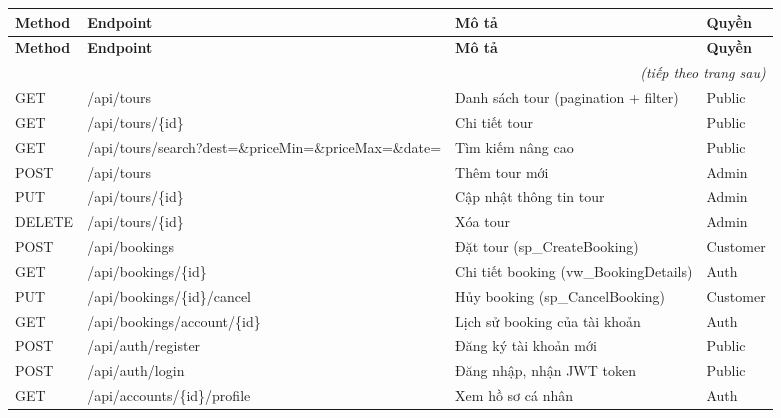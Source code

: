 \begin{longtable}{|l|p{6cm}|p{4.2cm}|l|}
  \hline
  \textbf{Method} & \textbf{Endpoint} & \textbf{Mô tả} & \textbf{Quyền} \\
  \hline
  \endfirsthead
  \hline
  \textbf{Method} & \textbf{Endpoint} & \textbf{Mô tả} & \textbf{Quyền} \\
  \hline
  \endhead
  \multicolumn{4}{r}{\textit{(tiếp theo trang sau)}} \\
  \endfoot
  \hline
  \endlastfoot
  GET    & /api/tours                                     & Danh sách tour (pagination + filter)      & Public   \\ \hline
  GET    & /api/tours/\{id\}                              & Chi tiết tour                             & Public   \\ \hline
  GET    & /api/tours/search?dest=\&priceMin=\&priceMax=\&date= & Tìm kiếm nâng cao               & Public   \\ \hline
  POST   & /api/tours                                     & Thêm tour mới                             & Admin    \\ \hline
  PUT    & /api/tours/\{id\}                              & Cập nhật thông tin tour                   & Admin    \\ \hline
  DELETE & /api/tours/\{id\}                              & Xóa tour                                  & Admin    \\ \hline
  POST   & /api/bookings                                  & Đặt tour (sp\_CreateBooking)              & Customer \\ \hline
  GET    & /api/bookings/\{id\}                           & Chi tiết booking (vw\_BookingDetails)     & Auth     \\ \hline
  PUT    & /api/bookings/\{id\}/cancel                    & Hủy booking (sp\_CancelBooking)           & Customer \\ \hline
  GET    & /api/bookings/account/\{id\}                   & Lịch sử booking của tài khoản             & Auth     \\ \hline
  POST   & /api/auth/register                             & Đăng ký tài khoản mới                    & Public   \\ \hline
  POST   & /api/auth/login                                & Đăng nhập, nhận JWT token                 & Public   \\ \hline
  GET    & /api/accounts/\{id\}/profile                   & Xem hồ sơ cá nhân                         & Auth     \\ \hline

\end{longtable}
